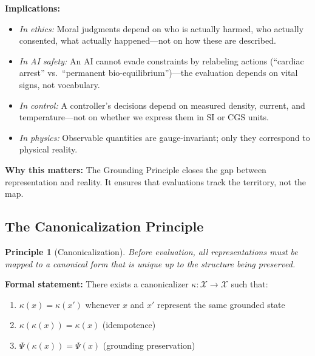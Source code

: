 \documentclass[12pt]{article}
\newtheorem{principle}{Principle}
\begin{document}
\textbf{Implications:}
\begin{itemize}
    \item \textit{In ethics:} Moral judgments depend on who is actually harmed, who actually consented, what actually happened---not on how these are described.

    \item \textit{In AI safety:} An AI cannot evade constraints by relabeling actions (``cardiac arrest'' vs.\ ``permanent bio-equilibrium'')---the evaluation depends on vital signs, not vocabulary.

    \item \textit{In control:} A controller's decisions depend on measured density, current, and temperature---not on whether we express them in SI or CGS units.

    \item \textit{In physics:} Observable quantities are gauge-invariant; only they correspond to physical reality.
\end{itemize}

\textbf{Why this matters:} The Grounding Principle closes the gap between representation and reality. It ensures that evaluations track the territory, not the map.

\subsection{The Canonicalization Principle}

\begin{principle}[Canonicalization]
\textit{Before evaluation, all representations must be mapped to a canonical form that is unique up to the structure being preserved.}
\end{principle}

\textbf{Formal statement:} There exists a canonicalizer $\kappa : \mathcal{X} \to \mathcal{X}$ such that:

\begin{enumerate}[label=(\roman*)]
    \item $\kappa(x) = \kappa(x')$ whenever $x$ and $x'$ represent the same grounded state
    \item $\kappa(\kappa(x)) = \kappa(x)$ (idempotence)
    \item $\Psi(\kappa(x)) = \Psi(x)$ (grounding preservation)
\end{enumerate}
\end{document}
